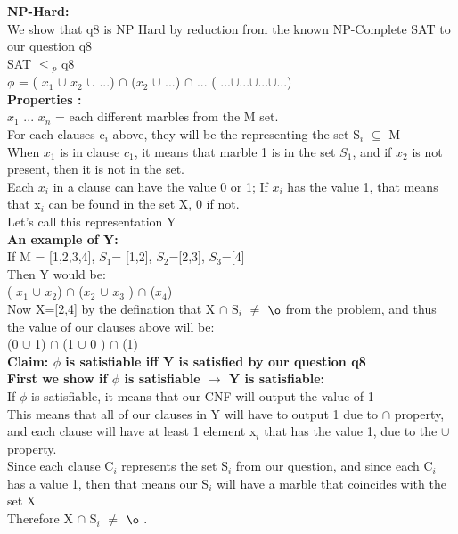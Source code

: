 \documentclass[10pt]{csc_assignment}
\begin{document}
\begin{description}
\textbf{NP-Hard:}\\
We show that q8 is NP Hard by reduction from the known NP-Complete SAT to our question q8\\ 
SAT $\leqslant$$_{p}$ q8 \\
$\phi$ = ( $x_{1}$ $\cup$ $x_{2}$ $\cup$ ...) $\cap$ ($x_{2}$ $\cup$ ...) $\cap$ ... ( ...$\cup$...$\cup$...$\cup$...)\\

\textbf{Properties :}\\
$x_{1}$ ... $x_{n}$ = each different marbles from the M set.\\
For each clauses c$_{i}$ above, they will be the representing the set S$_{i}$  $\subseteq$ M\\
When $x_{1}$ is in clause $c_{1}$, it means that marble 1 is in the set $S_{1}$, and if $x_{2}$ is not present, then it is not in the set.\\
Each $x_{i}$ in a clause can have the value 0 or 1; If $x_{i}$ has the value 1, that means that x$_{i}$ can be found in the set X, 0 if not.\\

Let's call this representation Y\\
\textbf{An example of Y:}\\
If M = [1,2,3,4], $S_{1}$= [1,2], $S_{2}$=[2,3], $S_{3}$=[4]\\
Then Y would be:\\
 ( $x_{1}$ $\cup$ $x_{2}$) $\cap$ ($x_{2}$ $\cup$ $x_{3}$ ) $\cap$ ($x_{4}$)\\

Now X=[2,4] by the defination that X $\cap$ S$_{i}$ $\not=$ ${\o}$ from the problem, and thus the value of our clauses above will be: \\
 (0 $\cup$ 1) $\cap$ (1 $\cup$ 0 ) $\cap$ (1)\\

\textbf{Claim: $\phi$ is satisfiable iff Y is satisfied by our question q8}\\

\textbf{First we show if $\phi$ is satisfiable $\rightarrow$ Y is satisfiable:}\\
If $\phi$ is satisfiable, it means that our CNF will output the value of 1\\
This means that all of our clauses in Y will have to output 1 due to $\cap$ property, and each clause will have at least 1 element x$_{i}$ that has the value 1, due to the $\cup$ property.\\
Since each clause C$_{i}$ represents the set S$_{i}$ from our question, and since each C$_{i}$ has a value 1, then that means our S$_{i}$ will have a marble that coincides with the set X\\
Therefore X $\cap$ S$_{i}$ $\not=$ ${\o}$ .\\


\end{description}
\end{document}
